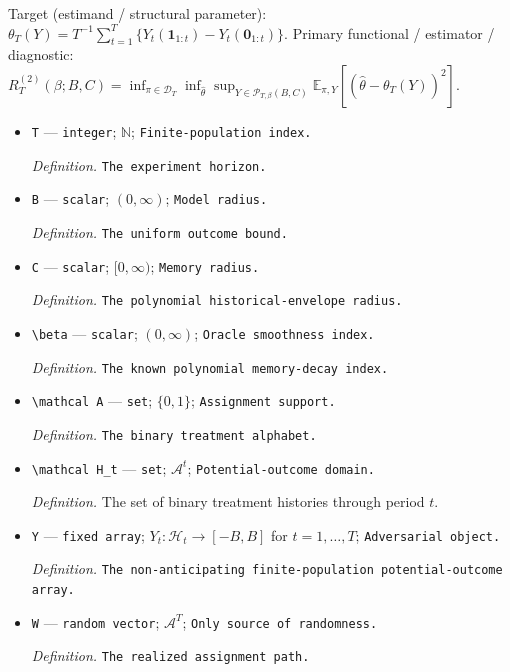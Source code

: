\documentclass{article}
\begin{document}
Target (estimand / structural parameter): \(\theta_T(Y)=T^{-1}\sum_{t=1}^T\{Y_t(\mathbf 1_{1:t})-Y_t(\mathbf 0_{1:t})\}\).
Primary functional / estimator / diagnostic: \(R_T^{(2)}(\beta;B,C)=\inf_{\pi\in\mathcal D_T}\inf_{\widehat\theta}\sup_{Y\in\mathcal P_{T,\beta}(B,C)}\mathbb E_{\pi,Y}[(\widehat\theta-\theta_T(Y))^2]\).
\begin{itemize}
  \item \texttt{T} --- \texttt{integer}; \(\mathbb N\); \texttt{Finite-\allowbreak{}population index.}
  \par\smallskip\noindent\emph{Definition.} \texttt{The experiment horizon.}
  \item \texttt{B} --- \texttt{scalar}; \((0,\infty)\); \texttt{Model radius.}
  \par\smallskip\noindent\emph{Definition.} \texttt{The uniform outcome bound.}
  \item \texttt{C} --- \texttt{scalar}; \([0,\infty)\); \texttt{Memory radius.}
  \par\smallskip\noindent\emph{Definition.} \texttt{The polynomial historical-\allowbreak{}envelope radius.}
  \item \texttt{\textbackslash{}\allowbreak{}beta} --- \texttt{scalar}; \((0,\infty)\); \texttt{Oracle smoothness index.}
  \par\smallskip\noindent\emph{Definition.} \texttt{The known polynomial memory-\allowbreak{}decay index.}
  \item \texttt{\textbackslash{}\allowbreak{}mathcal A} --- \texttt{set}; \(\{0,1\}\); \texttt{Assignment support.}
  \par\smallskip\noindent\emph{Definition.} \texttt{The binary treatment alphabet.}
  \item \texttt{\textbackslash{}\allowbreak{}mathcal H\_\allowbreak{}t} --- \texttt{set}; \(\mathcal A^t\); \texttt{Potential-\allowbreak{}outcome domain.}
  \par\smallskip\noindent\emph{Definition.} The set of binary treatment histories through period \(t\).
  \item \texttt{Y} --- \texttt{fixed array}; \(Y_t:\mathcal H_t\to[-B,B]\) for \(t=1,\ldots,T\); \texttt{Adversarial object.}
  \par\smallskip\noindent\emph{Definition.} \texttt{The non-\allowbreak{}anticipating finite-\allowbreak{}population potential-\allowbreak{}outcome array.}
  \item \texttt{W} --- \texttt{random vector}; \(\mathcal A^T\); \texttt{Only source of randomness.}
  \par\smallskip\noindent\emph{Definition.} \texttt{The realized assignment path.}

\end{itemize}
\end{document}
